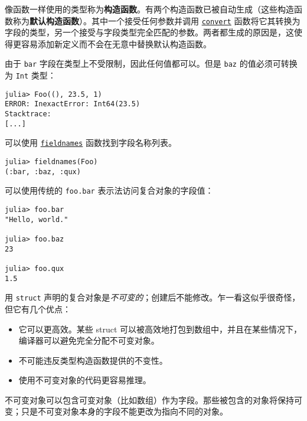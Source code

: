 像函数一样使用的类型称为\textbf{构造函数}。有两个构造函数已被自动生成（这些构造函数称为\textbf{默认构造函数}）。其中一个接受任何参数并调用 \hyperlink{1846942650946171605}{\texttt{convert}} 函数将它其转换为字段的类型，另一个接受与字段类型完全匹配的参数。两者都生成的原因是，这使得更容易添加新定义而不会在无意中替换默认构造函数。



由于 \texttt{bar} 字段在类型上不受限制，因此任何值都可以。但是 \texttt{baz} 的值必须可转换为 \texttt{Int} 类型：




\begin{verbatim}
julia> Foo((), 23.5, 1)
ERROR: InexactError: Int64(23.5)
Stacktrace:
[...]
\end{verbatim}



可以使用 \hyperlink{17481253338332315021}{\texttt{fieldnames}} 函数找到字段名称列表。




\begin{verbatim}
julia> fieldnames(Foo)
(:bar, :baz, :qux)
\end{verbatim}



可以使用传统的 \texttt{foo.bar} 表示法访问复合对象的字段值：




\begin{verbatim}
julia> foo.bar
"Hello, world."

julia> foo.baz
23

julia> foo.qux
1.5
\end{verbatim}



用 \texttt{struct} 声明的复合对象是\emph{不可变的}；创建后不能修改。乍一看这似乎很奇怪，但它有几个优点：



\begin{itemize}
\item 它可以更高效。某些 struct 可以被高效地打包到数组中，并且在某些情况下，编译器可以避免完全分配不可变对象。


\item 不可能违反类型构造函数提供的不变性。


\item 使用不可变对象的代码更容易推理。

\end{itemize}


不可变对象可以包含可变对象（比如数组）作为字段。那些被包含的对象将保持可变；只是不可变对象本身的字段不能更改为指向不同的对象。




